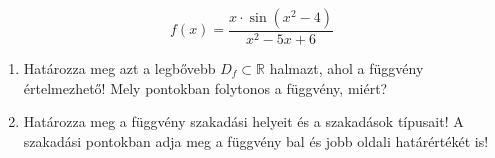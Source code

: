 \documentclass[11pt]{scrartcl}
\begin{document}
\[
	f(x) = \frac{x \cdot \sin(x^2 - 4)}{x^2 - 5x + 6}
\]
\begin{enumerate}
	\item Határozza meg azt a legbővebb $D_f \subset \mathbb{R}$ halmazt, ahol a
	      függvény értelmezhető! Mely pontokban folytonos a függvény, miért?

	\item Határozza meg a függvény szakadási helyeit és a szakadások típusait!
	      A szakadási pontokban adja meg a függvény bal és jobb oldali
	      határértékét is!
\end{enumerate}
\end{document}
